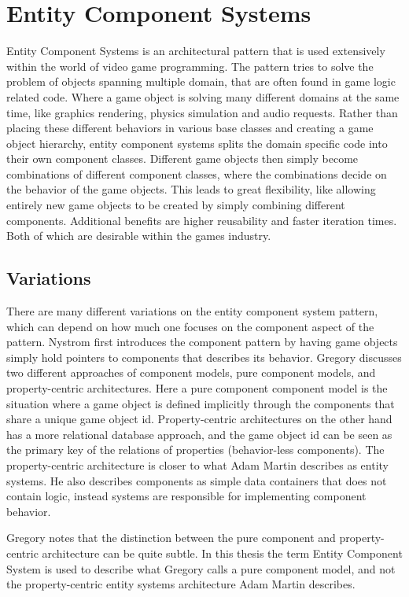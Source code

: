\section{Entity Component Systems}
Entity Component Systems is an architectural pattern that is used extensively within the world of video game programming.
The pattern tries to solve the problem of objects spanning multiple domain, that are often found in game logic related code.
Where a game object is solving many different domains at the same time, like graphics rendering, physics simulation and
audio requests.
Rather than placing these different behaviors in various base classes and creating a game object hierarchy,
entity component systems splits the domain specific code into their own component classes.
Different game objects then simply become combinations of different component classes,
where the combinations decide on the behavior of the game objects.
This leads to great flexibility, like allowing entirely new game objects to be created by simply combining different components.
Additional benefits are higher reusability and faster iteration times.
Both of which are desirable within the games industry\cite{game_programming_patterns}.

\subsection{Variations}
There are many different variations on the entity component system pattern, which can depend on how much one focuses on
the component aspect of the pattern.
Nystrom\cite[component]{game_programming_patterns} first introduces the component pattern by having game objects simply hold
pointers to components that describes its behavior.
Gregory\cite[p. 886]{game_engine_architecture} discusses two different approaches of component models, pure component models,
and property-centric architectures. Here a pure component component model is the situation where a game object is defined
implicitly through the components that share a unique game object id.
Property-centric architectures on the other hand has a more relational database approach, and the game object id can be seen
as the primary key of the relations of properties (behavior-less components).
The property-centric architecture is closer to what Adam Martin\cite{t_machine_entity_systems} describes as entity systems.
He also describes components as simple data containers that does not contain logic,
instead systems are responsible for implementing component behavior.

Gregory\cite[p. 890]{game_engine_architecture} notes that the distinction between the pure component and property-centric
architecture can be quite subtle.
In this thesis the term Entity Component System is used to describe what Gregory calls a pure component model,
and not the property-centric entity systems architecture Adam Martin describes.
